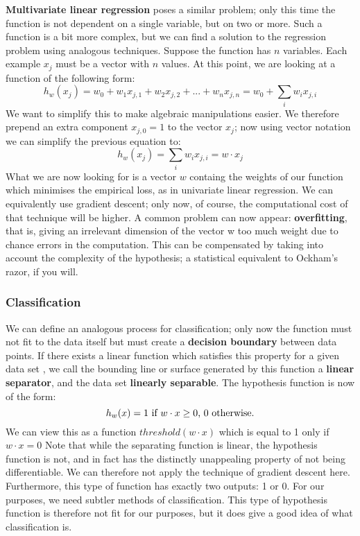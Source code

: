    \textbf{Multivariate linear regression} poses a similar problem;
    only this time the function is not dependent on a single variable, but
    on two or more. Such a function is a bit more complex, but we can
    find a solution to the regression problem using analogous
    techniques. Suppose the function has $n$ variables. Each example $x_j$
    must be a vector with $n$ values. At this point, we are looking at a
    function of the following form:
    \begin{equation}
      h_w(x_j) = w_0 + w_1x_{j,1} + w_2x_{j,2} + ... + w_nx_{j,n} = w_0 + \sum\limits_{i} w_ix_{j,i}
    \end{equation}
    We want to simplify this to make algebraic manipulations
    easier. We therefore prepend an extra component $x_{j,0} = 1$ to the
    vector $x_j$; now using vector notation we can simplify the
    previous equation to:
    \begin{equation}
      h_w(x_j) = \sum\limits_{i} w_ix_{j,i} = w \cdot x_j
    \end{equation}
    What we are now looking for is a vector $w$ containg the weights
    of our function which minimises the empirical loss, as in
    univariate linear regression. We can equivalently use gradient
    descent; only now, of course, the computational cost of that technique
    will be higher. A common problem can now appear: \textbf{overfitting},
    that is, giving an irrelevant dimension of the vector w too much
    weight due to chance errors in the computation. This can be
    compensated by taking into account the complexity of the hypothesis; a
    statistical equivalent to Ockham's razor, if you will.

    \subsubsection{Classification} 

    We can define an analogous process for classification; only now
    the function must not fit to the data itself but must create a
    \textbf{decision boundary} between data points. If there exists a
    linear function which satisfies this property for a given data set
    , we call the bounding line or surface generated by this function a
    \textbf{linear separator}, and the data set \textbf{linearly
      separable}. The hypothesis function is now of the form:
    \begin{equation}
      h_w(x) = 1$ if $ w \cdot x \geq 0$, $0$ otherwise.$
    \end{equation}
    We can view this as a function $threshold(w \cdot x)$ which is
    equal to 1 only if $w \cdot x = 0$ Note that while the separating
    function is linear, the hypothesis function is not, and in fact has
    the distinctly unappealing property of not being differentiable. We
    can therefore not apply the technique of gradient descent
    here. Furthermore, this type of function has exactly two outputs: 1 or
    0. For our purposes, we need subtler methods of classification.  This
    type of hypothesis function is therefore not fit for our purposes, but
    it does give a good idea of what classification is.

